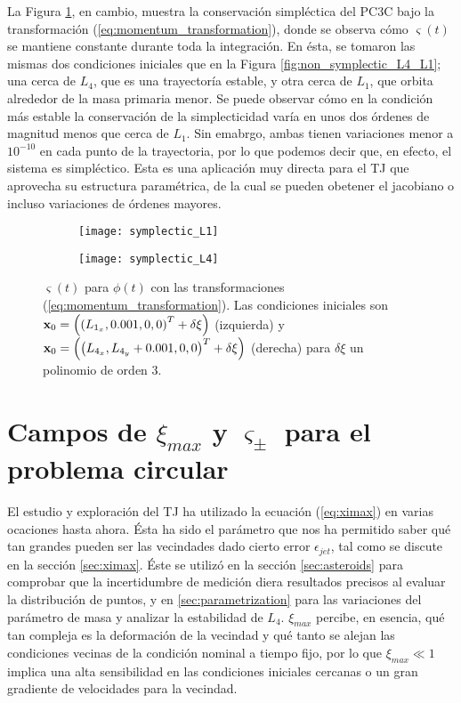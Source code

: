 La Figura \ref{fig:symplectic_L4_L1}, en cambio, muestra la conservación simpléctica del PC3C bajo la transformación (\ref{eq:momentum_transformation}), donde se observa cómo $\varsigma(t)$ se mantiene constante durante toda la integración. En ésta, se tomaron las mismas dos condiciones iniciales que en la Figura \ref{fig:non_symplectic_L4_L1}; una cerca de $L_4$, que es una trayectoría estable, y otra cerca de $L_1$, que orbita alrededor de la masa primaria menor. Se puede observar cómo en la condición más estable la conservación de la simplecticidad varía en unos dos órdenes de magnitud menos que cerca de $L_1$. Sin emabrgo, ambas tienen variaciones menor a $10^{-10}$ en cada punto de la trayectoria, por lo que podemos decir que, en efecto, el sistema es simpléctico. Esta es una aplicación muy directa para el TJ que aprovecha su estructura paramétrica, de la cual se pueden obetener el jacobiano o incluso variaciones de órdenes mayores. 

\begin{figure}[h!]
\centering
\begin{subfigure}{0.49\textwidth}
	\centering
	\texttt{[image: symplectic\_L1]}
\end{subfigure}
%
\begin{subfigure}{0.49\textwidth}
	\centering
	\texttt{[image: symplectic\_L4]}
\end{subfigure}
\caption{$\varsigma(t)$ para $\phi(t)$ con las transformaciones (\ref{eq:momentum_transformation}). Las condiciones iniciales son $\mathbf{x}_0 = \left( \left( L_{1_x}, 0.001, 0, 0 \right)^T + \delta \xi \right) $ (izquierda) y $ \mathbf{x}_0 = \left( \left( L_{4_x}, L_{4_y} + 0.001, 0, 0 \right)^T + \delta \xi \right) $ (derecha) para $\delta \xi$ un polinomio de orden $3$.}
\label{fig:symplectic_L4_L1}
\end{figure}


\section{Campos de $\xi_{max}$ y $\varsigma_\pm$ para el problema circular}
\label{sec:C3BP_heatmaps}

El estudio y exploración del TJ ha utilizado la ecuación (\ref{eq:ximax}) en varias ocaciones hasta ahora. Ésta ha sido el parámetro que nos ha permitido saber qué tan grandes pueden ser las vecindades dado cierto error $\epsilon_{jet}$, tal como se discute en la sección \ref{sec:ximax}. Éste se utilizó en la sección \ref{sec:asteroids} para comprobar que la incertidumbre de medición diera resultados precisos al evaluar la distribución de puntos, y en \ref{sec:parametrization} para las variaciones del parámetro de masa y analizar la estabilidad de $L_4$. $\xi_{max}$ percibe, en esencia, qué tan compleja es la deformación de la vecindad y qué tanto se alejan las condiciones vecinas de la condición nominal a tiempo fijo, por lo que $\xi_{max} \ll 1$ implica una alta sensibilidad en las condiciones iniciales cercanas o un gran gradiente de velocidades para la vecindad. 

